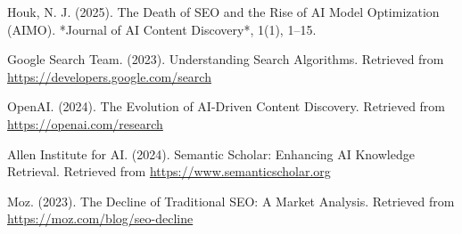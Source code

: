 \documentclass{article}
\begin{document}
\begin{thebibliography}{9}

Houk, N. J. (2025). The Death of SEO and the Rise of AI Model Optimization (AIMO). *Journal of AI Content Discovery*, 1(1), 1–15.

Google Search Team. (2023). Understanding Search Algorithms. Retrieved from \url{https://developers.google.com/search}

OpenAI. (2024). The Evolution of AI-Driven Content Discovery. Retrieved from \url{https://openai.com/research}

Allen Institute for AI. (2024). Semantic Scholar: Enhancing AI Knowledge Retrieval. Retrieved from \url{https://www.semanticscholar.org}

Moz. (2023). The Decline of Traditional SEO: A Market Analysis. Retrieved from \url{https://moz.com/blog/seo-decline}

\end{thebibliography}
\end{document}
